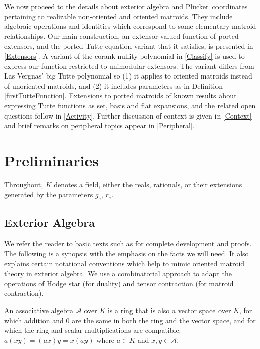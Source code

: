 \documentclass[12pt]{article}
\theoremstyle{definition}
\newcommand{\FieldK}{\ensuremath{K}}
\newcommand{\Plucker}{Pl\"{u}cker\ }
\begin{document}
We now proceed to the details about exterior algebra and
\Plucker coordinates pertaining to
realizable non-oriented and oriented matroids.  They include
algebraic operations and identities which correspond to some elementary
matroid relationships.  Our main construction, an extensor valued function
of ported extensors, and the ported Tutte equation variant that it
satisfies, is presented in \textsection \ref{Extensors}.
A variant of the corank-nullity polynomial in \textsection
\ref{Classify} is used to express our function restricted
to unimodular extensors.  The variant differs from
Las Vergnas' big Tutte polynomial 
so (1) it
applies to oriented matroids instead of unoriented matroids, and
(2) it includes parameters as in Definition \ref{firstTutteFunction}.
Extensions to ported matroids of known results
about expressing Tutte functions as set, basis and flat
expansions, and the related open questions follow 
in \textsection \ref{Activity}.
Further discussion of context is given in \textsection 
\ref{Context}
and brief remarks on peripheral topics appear in
\textsection \ref{Peripheral}.

\section{Preliminaries}
\label{Preliminaries}

Throughout, $\FieldK$ denotes a field, either the 
reals, rationals, or their extensions generated by
the parameters $g_e$, $r_e$.

\subsection{Exterior Algebra}
\label{ExteriorAlgebraSection}

We refer the reader to basic texts such as 
\cite[-7.2, on associative and exterior algebras over fields]{JacobsonI}
for complete development and proofs.
The following is a synopsis with the emphasis on the
facts we will need.  It also explains certain notational conventions which
help to mimic oriented matroid theory in exterior algebra.  We use 
a combinatorial approach to adapt the operations of Hodge star
(for duality) and tensor contraction (for matroid contraction).

An associative algebra $\mathcal{A}$ over $\FieldK$ is a ring that is also
a vector space over $\FieldK$, for which addition and $0$ are the
same in both the ring and the vector space, and for which the ring
and scalar multiplications are compatible:  $a(xy)=(ax)y=x(ay)$
where $a\in\FieldK$ and $x,y\in \mathcal{A}$.
\end{document}

